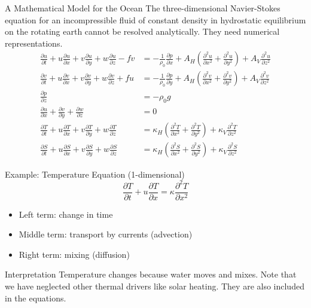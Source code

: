 \documentclass[english,aspectratio=169]{beamer}
\begin{document}
\begin{frame}{A Mathematical Model for the Ocean}
\small{The three-dimensional Navier-Stokes equation for an incompressible
fluid of constant density in hydrostatic equilibrium on the rotating
earth cannot be resolved analytically. They need numerical representations.}
\begin{align*}
\frac{\partial u}{\partial t}+u\frac{\partial u}{\partial x}+v\frac{\partial u}{\partial y}+w\frac{\partial u}{\partial z}-fv & =-\frac{1}{\rho_{0}}\frac{\partial p}{\partial x}+A_{H}\left(\frac{\partial^{2}u}{\partial x^{2}}+\frac{\partial^{2}u}{\partial y^{2}}\right)+A_{V}\frac{\partial^{2}u}{\partial z^{2}}\\
\frac{\partial v}{\partial t}+u\frac{\partial v}{\partial x}+v\frac{\partial v}{\partial y}+w\frac{\partial v}{\partial z}+fu & =-\frac{1}{\rho_{0}}\frac{\partial p}{\partial y}+A_{H}\left(\frac{\partial^{2}v}{\partial x^{2}}+\frac{\partial^{2}v}{\partial y^{2}}\right)+A_{V}\frac{\partial^{2}v}{\partial z^{2}}\\
\frac{\partial p}{\partial z} & =-\rho_{0}g\\
\frac{\partial u}{\partial x}+\frac{\partial v}{\partial y}+\frac{\partial w}{\partial z} & =0\\
\frac{\partial T}{\partial t}+u\frac{\partial T}{\partial x}+v\frac{\partial T}{\partial y}+w\frac{\partial T}{\partial z} & =\kappa_{H}\left(\frac{\partial^{2} T}{\partial x^{2}}+\frac{\partial^{2} T}{\partial y^{2}}\right)+\kappa_{V}\frac{\partial^{2} T}{\partial z^{2}}\\
\frac{\partial S}{\partial t}+u\frac{\partial S}{\partial x}+v\frac{\partial S}{\partial y}+w\frac{\partial S}{\partial z} & =\kappa_{H}\left(\frac{\partial^{2}S}{\partial x^{2}}+\frac{\partial^{2}S}{\partial y^{2}}\right)+\kappa_{V}\frac{\partial^{2}S}{\partial z^{2}}
\end{align*}

\end{frame}


\begin{frame}{Example: Temperature Equation (1-dimensional)}
\[
\frac{\partial T}{\partial t} + u \frac{\partial T}{\partial x} = \kappa \frac{\partial^2 T}{\partial x^2}
\]

\begin{itemize}
\item Left term: change in time
\item Middle term: transport by currents (advection)
\item Right term: mixing (diffusion)
\end{itemize}

\begin{block}{Interpretation}
Temperature changes because water moves and mixes. Note that we have neglected other thermal drivers like solar heating. They are also included in the equations.
\end{block}
\end{frame}
\end{document}
